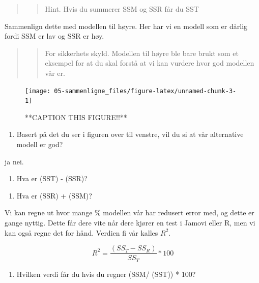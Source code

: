 \documentclass[
]{book}
\providecommand{\tightlist}{%
  \setlength{\itemsep}{0pt}\setlength{\parskip}{0pt}}
\begin{document}
\begin{quote}
\begin{quote}
Hint. Hvis du summerer SSM og SSR får du SST
\end{quote}
\end{quote}

Sammenlign dette med modellen til høyre. Her har vi en modell som er dårlig fordi SSM er lav og SSR er høy.

\begin{quote}
\begin{quote}
For sikkerhets skyld. Modellen til høyre ble bare brukt som et eksempel for at du skal forstå at vi kan vurdere hvor god modellen vår er.
\end{quote}
\end{quote}

\begin{figure}

{\centering \texttt{[image: 05-sammenligne\_files/figure-latex/unnamed-chunk-3-1]} 

}

\caption{**CAPTION THIS FIGURE!!**}\label{fig:unnamed-chunk-3}
\end{figure}

\begin{enumerate}
\def\labelenumi{\alph{enumi}.}
\setcounter{enumi}{4}
\tightlist
\item
  Basert på det du ser i figuren over til venstre, vil du si at vår alternative modell er god?
\end{enumerate}

ja nei.

\begin{enumerate}
\def\labelenumi{\alph{enumi}.}
\setcounter{enumi}{3}
\tightlist
\item
  Hva er (SST) - (SSR)?
\end{enumerate}

\begin{enumerate}
\def\labelenumi{\alph{enumi}.}
\setcounter{enumi}{4}
\tightlist
\item
  Hva er (SSR) + (SSM)?
\end{enumerate}

Vi kan regne ut hvor mange \% modellen vår har redusert error med, og dette er gange nyttig. Dette får dere vite når dere kjører en test i Jamovi eller R, men vi kan også regne det for hånd. Verdien fi vår kalles \(R^2\).

\[
R^2 = \frac{(SS_T - SS_R)}{SS_T} * 100
\]

\begin{enumerate}
\def\labelenumi{\alph{enumi}.}
\setcounter{enumi}{4}
\tightlist
\item
  Hvilken verdi får du hvis du regner (SSM/ (SST)) * 100?
\end{enumerate}
\end{document}
